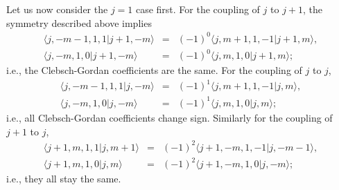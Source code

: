 \documentclass[rmp,amsfonts,showpacs,showkeys,preprint]{revtex4}
\begin{document}
Let us now
consider the $j=1$ case first. For the coupling of $j$ to $j+1$, the symmetry described above
implies
\begin{equation}
\begin{array}{rcl}
\langle j,-m-1,1,1|j+1,-m\rangle
&= &(-1)^{0}\langle j,m+1,1,-1|j+1,m\rangle ,\\
\langle j,-m,1,0|j+1,-m\rangle &= &(-1)^{0}\langle
j,m,1,0|j+1,m\rangle ;
\end{array}
\end{equation}
i.e., the Clebsch-Gordan
coefficients are the same.
For the coupling of $j$ to $j$,
\begin{equation}
\begin{array}{rcl}
\langle j,-m-1,1,1|j,-m\rangle
&= &(-1)^{1}\langle j,m+1,1,-1|j,m\rangle ,\\
\langle j,-m,1,0|j,-m\rangle & = &(-1)^{1}\langle
j,m,1,0|j,m\rangle ;
\end{array}
\end{equation}
i.e., all Clebsch-Gordan coefficients change  sign.
Similarly for the coupling of $j+1$ to $j$,
\begin{equation}
\begin{array}{rcl}
\langle j+1,m,1,1|j,m+1\rangle
&= &(-1)^{2}\langle j+1,-m,1,-1|j,-m-1\rangle ,\\
\langle j+1,m,1,0|j,m\rangle &= &(-1)^{2}\langle
j+1,-m,1,0|j,-m\rangle ;
\end{array}
\end{equation}
i.e., they all stay the same.
\end{document}

